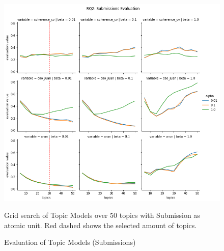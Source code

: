 \documentclass{article}
\begin{document}
    \begin{figure}[H]
        \begin{centering}
        \includegraphics[scale=0.4]{../Figure/H2_submissions_red.png}
        \caption{Evaluation of Topic Models (Submissions)}
        \end{centering}
        \begin{footnotesize} 
            Grid search of Topic Models over 50 topics with Submission as atomic unit. Red dashed shows the selected amount of topics.  
        \end{footnotesize}
    \end{figure}

    

    
\end{document}
